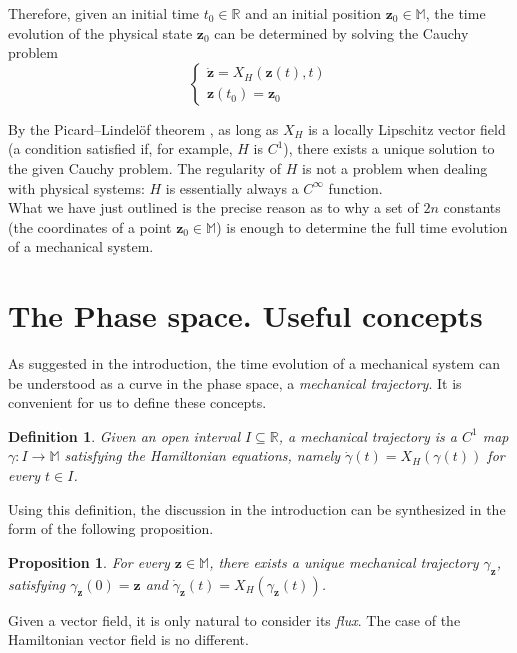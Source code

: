 \documentclass[12pt]{article}
\theoremstyle{plain}
\newtheorem{definition}{Definition}[section]
\newtheorem{proposition}{Proposition}[section]
\newcommand{\R}{\mathbb{R}}
\newcommand{\M}{\mathbb{M}}
\begin{document}
Therefore, given an initial time $t_0\in\R$ and an initial position $\mathbf{z}_0\in\M$, the time evolution of the physical state $\mathbf{z}_0$ can be determined by solving the Cauchy problem 
$$\begin{cases}
    \dot{\mathbf{z}} = X_H(\mathbf{z}(t),t)\\
    \mathbf{z}(t_0) = \mathbf{z}_0
\end{cases}$$

By the Picard–Lindelöf theorem \cite{coddington1955theory}, as long as $X_H$ is a locally Lipschitz vector field (a condition satisfied if, for example, $H$ is $C^1$), there exists a unique solution to the given Cauchy problem. The regularity of $H$ is not a problem when dealing with physical systems: $H$ is essentially always a $C^\infty$ function.\\

What we have just outlined is the precise reason as to why a set of $2n$ constants (the coordinates of a point $\mathbf{z}_0\in\M$) is enough to determine the full time evolution of a mechanical system.

\section{The Phase space. Useful concepts}

As suggested in the introduction, the time evolution of a mechanical system can be understood as a curve in the phase space, a \textit{mechanical trajectory}. It is convenient for us to define these concepts.

\begin{definition}
    Given an open interval $I\subseteq \R$, a \textup{mechanical trajectory} is a $C^1$ map $\gamma\colon I\to \M$ satisfying the Hamiltonian equations, namely $\dot{\gamma}(t) = X_H(\gamma(t))$ for every $t\in I$.
\end{definition}

Using this definition, the discussion in the introduction can be synthesized in the form of the following proposition.

\begin{proposition}\label{uniq}
    For every $\mathbf{z}\in\M$, there exists a unique mechanical trajectory $\gamma_\mathbf{z}$, satisfying $\gamma_\mathbf{z}(0) = \mathbf{z}$ and $\dot{\gamma}_\mathbf{z}(t) = X_H(\gamma_\mathbf{z}(t))$.
\end{proposition}

Given a vector field, it is only natural to consider its \textit{flux}. The case of the Hamiltonian vector field is no different.
\end{document}
